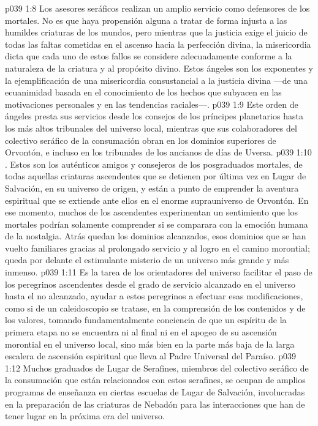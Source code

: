 \vs p039 1:8 Los asesores seráficos realizan un amplio servicio como defensores de los mortales. No es que haya propensión alguna a tratar de forma injusta a las humildes criaturas de los mundos, pero mientras que la justicia exige el juicio de todas las faltas cometidas en el ascenso hacia la perfección divina, la misericordia dicta que cada uno de estos fallos se considere adecuadamente conforme a la naturaleza de la criatura y al propósito divino. Estos ángeles son los exponentes y la ejemplificación de una misericordia consustancial a la justicia divina ---de una ecuanimidad basada en el conocimiento de los hechos que subyacen en las motivaciones personales y en las tendencias raciales---.
\vs p039 1:9 Este orden de ángeles presta sus servicios desde los consejos de los príncipes planetarios hasta los más altos tribunales del universo local, mientras que sus colaboradores del colectivo seráfico de la consumación obran en los dominios superiores de Orvontón, e incluso en los tribunales de los ancianos de días de Uversa.
\vs p039 1:10 . Estos son los auténticos amigos y consejeros de los posgraduados mortales, de todas aquellas criaturas ascendentes que se detienen por última vez en Lugar de Salvación, en su universo de origen, y están a punto de emprender la aventura espiritual que se extiende ante ellos en el enorme suprauniverso de Orvontón. En ese momento, muchos de los ascendentes experimentan un sentimiento que los mortales podrían solamente comprender si se comparara con la emoción humana de la nostalgia. Atrás quedan los dominios alcanzados, esos dominios que se han vuelto familiares gracias al prolongado servicio y al logro en el camino morontial; queda por delante el estimulante misterio de un universo más grande y más inmenso.
\vs p039 1:11 Es la tarea de los orientadores del universo facilitar el paso de los peregrinos ascendentes desde el grado de servicio alcanzado en el universo hasta el no alcanzado, ayudar a estos peregrinos a efectuar esas modificaciones, como si de un caleidoscopio se tratase, en la comprensión de los contenidos y de los valores, tomando fundamentalmente conciencia de que un espíritu de la primera etapa no se encuentra ni al final ni en el apogeo de su ascensión morontial en el universo local, sino más bien en la parte más baja de la larga escalera de ascensión espiritual que lleva al Padre Universal del Paraíso.
\vs p039 1:12 Muchos graduados de Lugar de Serafines, miembros del colectivo seráfico de la consumación que están relacionados con estos serafines, se ocupan de amplios programas de enseñanza en ciertas escuelas de Lugar de Salvación, involucradas en la preparación de las criaturas de Nebadón para las interacciones que han de tener lugar en la próxima era del universo.

